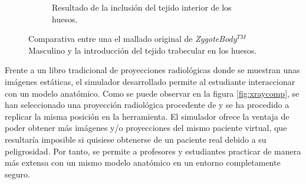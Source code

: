 \begin{figure}[h]
\begin{subfigure}[b]{0.45\linewidth}
        \caption{Resultado de la inclusión del tejido interior de los huesos.}
    \end{subfigure}
    \caption{\label{fig:bonecompare} Comparativa entre una el mallado original de \emph{ZygoteBody}$^{TM}$ Masculino y la introducción del tejido trabecular en los huesos.}
   \end{figure}


Frente a un libro tradicional de proyecciones radiológicas donde se muestran unas imágenes estáticas, 
el simulador desarrollado permite al estudiante interaccionar con un modelo anatómico.
Como se puede observar en la figura \ref{fig:xraycomp}, se han seleccionado una proyección radiológica procedente de \cite{carver2012medical} y se ha procedido a replicar la misma posición en la herramienta. El simulador ofrece la ventaja de poder obtener más imágenes y/o proyecciones del mismo paciente virtual, que resultaría imposible si quisiese obtenerse de un paciente real debido a su peligrosidad. Por tanto, se  permite a profesores y estudiantes practicar de manera más extensa con un mismo modelo anatómico en un entorno completamente seguro.



